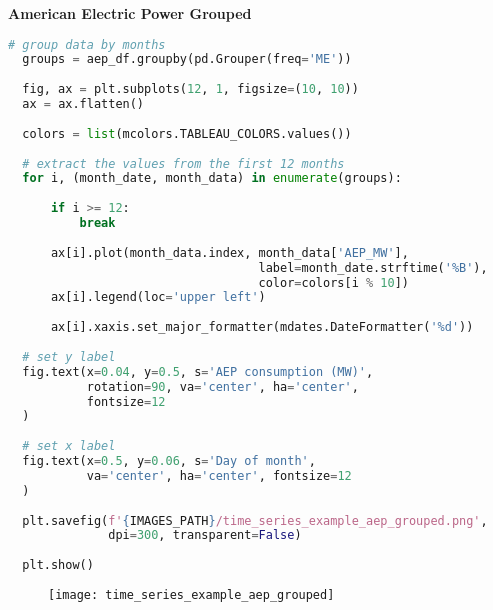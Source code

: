 {\noindent\hspace{-12.5pt}\normalsize\bfseries American Electric Power Grouped}\vspace{-10pt}
\begin{center}
  \begin{lstlisting}[language=Python, 
  caption={Ежечасовое потребление электричества в Америке в каждом месяце.}, 
  label={lst:time_series_example_aep_grouped}]
  # group data by months
  groups = aep_df.groupby(pd.Grouper(freq='ME'))
  
  fig, ax = plt.subplots(12, 1, figsize=(10, 10))
  ax = ax.flatten()
  
  colors = list(mcolors.TABLEAU_COLORS.values())
  
  # extract the values from the first 12 months
  for i, (month_date, month_data) in enumerate(groups):
  
      if i >= 12:
          break
  
      ax[i].plot(month_data.index, month_data['AEP_MW'], 
                                   label=month_date.strftime('%B'),
                                   color=colors[i % 10])
      ax[i].legend(loc='upper left')
  
      ax[i].xaxis.set_major_formatter(mdates.DateFormatter('%d')) 
  
  # set y label
  fig.text(x=0.04, y=0.5, s='AEP consumption (MW)', 
           rotation=90, va='center', ha='center', 
           fontsize=12  
  )
  
  # set x label
  fig.text(x=0.5, y=0.06, s='Day of month', 
           va='center', ha='center', fontsize=12  
  )
  
  plt.savefig(f'{IMAGES_PATH}/time_series_example_aep_grouped.png', 
              dpi=300, transparent=False)
  
  plt.show()
  \end{lstlisting}
\end{center}

\begin{figure}[h!]
  \centering
  \texttt{[image: time\_series\_example\_aep\_grouped]}
\end{figure}\newpage


